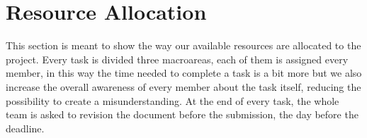 \section{Resource Allocation}

This section is meant to show the way our available resources are allocated to the project. Every task is divided three macroareas, each of them is assigned every member, in this way the time needed to complete a task is a bit more but we also increase the overall awareness of every member about the task itself, reducing the possibility to create a misunderstanding.
At the end of every task, the whole team is asked to revision the document before the submission, the day before the deadline.
 
